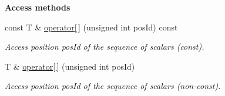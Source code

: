 \begin{Indent}{\bf Access methods}\par
\begin{DoxyCompactItemize}
\item 
const T \& \hyperlink{class_q_u_e_s_o_1_1_scalar_sequence_a3db5b2ad778478ee3ba02a1509b79b40}{operator\mbox{[}$\,$\mbox{]}} (unsigned int pos\-Id) const 
\begin{DoxyCompactList}\small\item\em Access position {\ttfamily pos\-Id} of the sequence of scalars (const). \end{DoxyCompactList}\item 
T \& \hyperlink{class_q_u_e_s_o_1_1_scalar_sequence_a697cc582a5d27f69590daded53948003}{operator\mbox{[}$\,$\mbox{]}} (unsigned int pos\-Id)
\begin{DoxyCompactList}\small\item\em Access position {\ttfamily pos\-Id} of the sequence of scalars (non-\/const). \end{DoxyCompactList}\end{DoxyCompactItemize}
\end{Indent}
